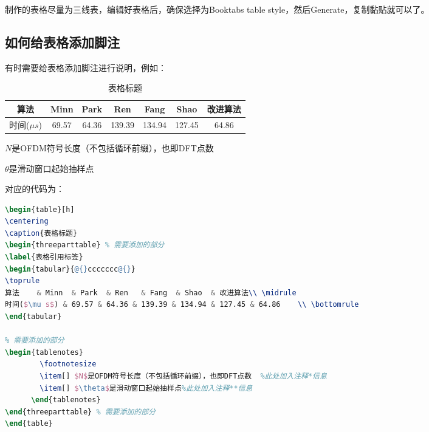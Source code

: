 制作的表格尽量为三线表，编辑好表格后，确保选择为Booktabs table style，然后Generate，复制黏贴就可以了。

\subsection{如何给表格添加脚注}
有时需要给表格添加脚注进行说明，例如：
\begin{table}[h]
\centering
\caption{表格标题}
\begin{threeparttable}
\label{表格引用标签}
\begin{tabular}{@{}ccccccc@{}}
\toprule
算法    & Minn  & Park  & Ren   & Fang  & Shao  & 改进算法\\ \midrule
时间($\mu s$) & 69.57 & 64.36 & 139.39 & 134.94 & 127.45 & 64.86    \\ \bottomrule
\end{tabular}
\begin{tablenotes}
        \footnotesize
        \item[] $N$是OFDM符号长度（不包括循环前缀），也即DFT点数  %
        \item[] $\theta$是滑动窗口起始抽样点%
      \end{tablenotes}
\end{threeparttable}
\end{table}

对应的代码为：
\begin{lstlisting}[language={tex}, caption={}]
\begin{table}[h] 
\centering
\caption{表格标题}
\begin{threeparttable} % 需要添加的部分
\label{表格引用标签}
\begin{tabular}{@{}ccccccc@{}}
\toprule
算法    & Minn  & Park  & Ren   & Fang  & Shao  & 改进算法\\ \midrule
时间($\mu s$) & 69.57 & 64.36 & 139.39 & 134.94 & 127.45 & 64.86    \\ \bottomrule
\end{tabular}

% 需要添加的部分
\begin{tablenotes}
        \footnotesize
        \item[] $N$是OFDM符号长度（不包括循环前缀），也即DFT点数  %此处加入注释*信息
        \item[] $\theta$是滑动窗口起始抽样点%此处加入注释**信息
      \end{tablenotes}
\end{threeparttable} % 需要添加的部分
\end{table}
\end{lstlisting}
